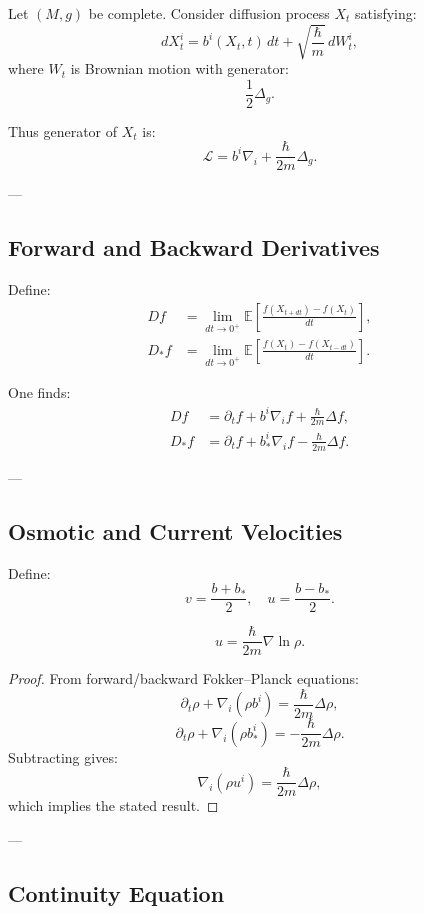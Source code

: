Let $(M,g)$ be complete. Consider diffusion process $X_t$ satisfying:
\[
dX_t^i = b^i(X_t,t)\,dt + \sqrt{\frac{\hbar}{m}}\, dW_t^i,
\]
where $W_t$ is Brownian motion with generator:
\[
\frac{1}{2}\Delta_g.
\]

Thus generator of $X_t$ is:
\[
\mathcal{L} = b^i \nabla_i + \frac{\hbar}{2m}\Delta_g.
\]

---

\subsection{Forward and Backward Derivatives}

Define:
\begin{align}
D f &= \lim_{dt\to0^+} \mathbb{E}\left[\frac{f(X_{t+dt}) - f(X_t)}{dt}\right],\\
D_* f &= \lim_{dt\to0^+} \mathbb{E}\left[\frac{f(X_t) - f(X_{t-dt})}{dt}\right].
\end{align}

One finds:
\begin{align}
D f &= \partial_t f + b^i \nabla_i f + \frac{\hbar}{2m}\Delta f,\\
D_* f &= \partial_t f + b_*^i \nabla_i f - \frac{\hbar}{2m}\Delta f.
\end{align}

---

\subsection{Osmotic and Current Velocities}

Define:
\[
v = \frac{b + b_*}{2}, \quad u = \frac{b - b_*}{2}.
\]

\begin{proposition}
\[
u = \frac{\hbar}{2m} \nabla \ln \rho.
\]
\end{proposition}

\begin{proof}
From forward/backward Fokker--Planck equations:
\[
\partial_t \rho + \nabla_i(\rho b^i) = \frac{\hbar}{2m}\Delta \rho,
\]
\[
\partial_t \rho + \nabla_i(\rho b_*^i) = -\frac{\hbar}{2m}\Delta \rho.
\]
Subtracting gives:
\[
\nabla_i(\rho u^i) = \frac{\hbar}{2m}\Delta \rho,
\]
which implies the stated result.
\end{proof}

---

\subsection{Continuity Equation}

